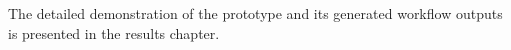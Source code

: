 The detailed demonstration of the prototype and its generated workflow outputs is presented in the results chapter.








